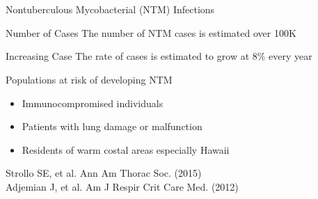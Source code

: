 \documentclass[11pt, xcolor=table]{beamer}
\begin{document}
\section{}


	\begin{frame}{Nontuberculous Mycobacterial (NTM) Infections}
	  
		\begin{block}{Number of Cases}
		The number of NTM cases is estimated over 100K
		\end{block}
		
		\begin{block}{Increasing Case}
		The rate of cases is estimated to grow at 8\% every year
		\end{block}
		
		
		\begin{block}{Populations at risk of developing NTM}
		\begin{itemize}
		\item Immunocompromised individuals 
		\item Patients with lung damage or malfunction 
		\item Residents of warm costal areas especially Hawaii
		\end{itemize}
		\end{block} 
		
		\begin{block}
		
		\end{block}
	\vspace{-1cm}
	\tiny{Strollo SE, et al. Ann Am Thorac Soc. (2015) \\
	Adjemian J, et al. Am J Respir Crit Care Med. (2012)}
	
	\end{frame}
\end{document}
